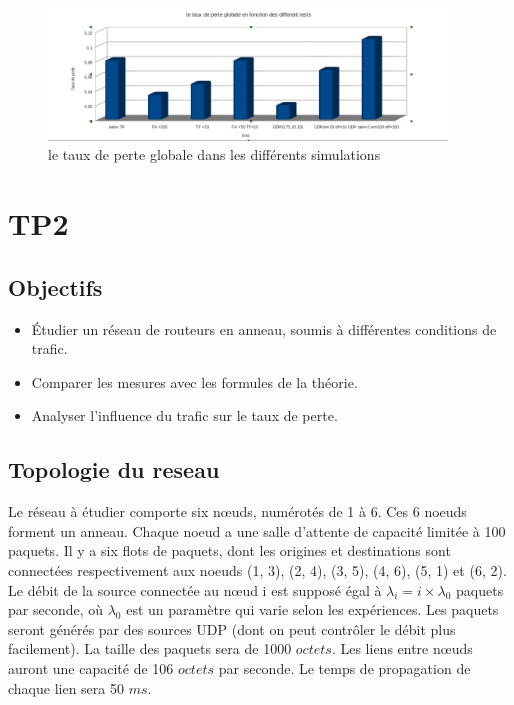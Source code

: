 \documentclass[a4paper]{report}
\theoremstyle{definition}
\begin{document}
\begin{figure}[h]
	\centering
		\includegraphics[width=400px]{graphic/conclu.png}
		\caption{le taux de perte globale dans les différents simulations}
\end{figure}
\newpage






















\chapter*{TP2}
\section*{Objectifs}
\begin{itemize}
 \item  Étudier un réseau de routeurs en anneau, soumis à différentes conditions de trafic.
 \item  Comparer les mesures avec les formules de la théorie.
 \item Analyser l’influence du trafic sur le taux de perte.
\end{itemize}

\section*{Topologie du reseau} 

Le réseau à étudier comporte six nœuds, numérotés de 1 à 6. Ces 6 noeuds forment un anneau.
Chaque noeud a une salle d’attente de capacité limitée à 100 paquets. Il y a six flots de paquets, dont
les origines et destinations sont connectées respectivement aux noeuds (1, 3), (2, 4), (3, 5), (4, 6), (5, 1) et
(6, 2). Le débit de la source connectée au nœud i est supposé égal à $\lambda_i = i \times \lambda_0$ paquets par seconde, où
$\lambda_0$ est un paramètre qui varie selon les expériences.
Les paquets seront générés par des sources UDP (dont on peut contrôler le débit plus facilement).
La taille des paquets sera de 1000 $octets$. Les liens entre nœuds auront une capacité de 106 $octets$ par
seconde. Le temps de propagation de chaque lien sera 50 $ms$.
\end{document}
